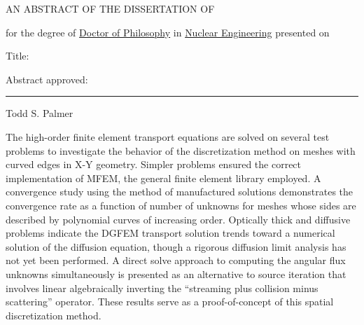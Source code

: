 \documentclass[12pt]{article}
\begin{document}
\begin{singlespace}

\begin{center}
AN ABSTRACT OF THE DISSERTATION OF
\end{center}

\vspace{12pt}

\noindent
\uline{\ThesisAuthor} for the degree of \uline{Doctor of Philosophy} in \uline{Nuclear Engineering} presented on \uline{\DefenseDate}

\vspace{12pt}

\noindent
Title: \uline{\ThesisTitle}

\vspace{12pt}

\noindent
Abstract approved:

\vspace{12pt}

\noindent
\begin{center}
\rule{\textwidth}{0.4pt}

\noindent
Todd S. Palmer
\end{center}

\vspace{12pt}

\end{singlespace}

{\color{red}
The high-order finite element \SN transport equations are solved on several test problems to investigate the behavior of the discretization method on meshes with curved edges in X-Y geometry. Simpler problems ensured the correct implementation of MFEM, the general finite element library employed. A convergence study using the method of manufactured solutions demonstrates the convergence rate as a function of number of unknowns for meshes whose sides are described by polynomial curves of increasing order. Optically thick and diffusive problems indicate the DGFEM transport solution trends toward a numerical solution of the diffusion equation, though a rigorous diffusion limit analysis has not yet been performed. A direct solve approach to computing the angular flux unknowns simultaneously is presented as an alternative to source iteration that involves linear algebraically inverting the ``streaming plus collision minus scattering'' operator. These results serve as a proof-of-concept of this spatial discretization method.
}
\end{document}
